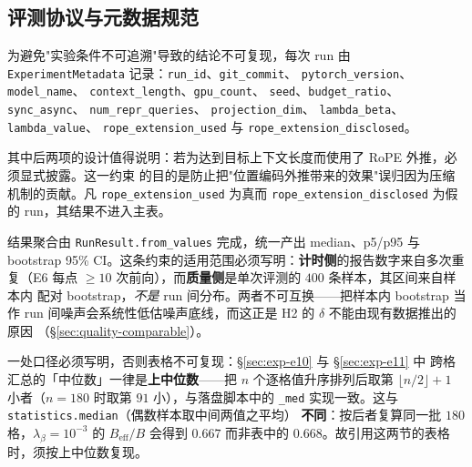 \subsection{评测协议与元数据规范}
\label{sec:exp-metadata}

为避免"实验条件不可追溯"导致的结论不可复现，每次 run 由 \texttt{ExperimentMetadata}
记录：\texttt{run\_}\allowbreak\texttt{id}、\texttt{git\_}\allowbreak\texttt{commit}、
\texttt{pytorch\_}\allowbreak\texttt{version}、\texttt{model\_}\allowbreak\texttt{name}、
\texttt{context\_}\allowbreak\texttt{length}、\texttt{gpu\_}\allowbreak\texttt{count}、
\texttt{seed}、\texttt{budget\_}\allowbreak\texttt{ratio}、
\texttt{sync\_}\allowbreak\texttt{async}、
\texttt{num\_}\allowbreak\texttt{repr\_}\allowbreak\texttt{queries}、
\texttt{projection\_}\allowbreak\texttt{dim}、
\texttt{lambda\_}\allowbreak\texttt{beta}、\texttt{lambda\_}\allowbreak\texttt{value}、
\texttt{rope\_}\allowbreak\texttt{extension\_}\allowbreak\texttt{used} 与
\texttt{rope\_}\allowbreak\texttt{extension\_}\allowbreak\texttt{disclosed}。

其中后两项的设计值得说明：若为达到目标上下文长度而使用了 RoPE 外推，必须显式披露。这一约束
的目的是防止把"位置编码外推带来的效果"误归因为压缩机制的贡献。凡
\texttt{rope\_}\allowbreak\texttt{extension\_}\allowbreak\texttt{used}
为真而 \texttt{rope\_}\allowbreak\texttt{extension\_}\allowbreak\texttt{disclosed}
为假的 run，其结果不进入主表。

结果聚合由 \texttt{RunResult.from\_values} 完成，统一产出 median、p5/p95 与
bootstrap 95\% CI。这条约束的适用范围必须写明：\textbf{计时侧}的报告数字来自多次重复（E6 每点
$\ge 10$ 次前向），而\textbf{质量侧}是单次评测的 $400$ 条样本，其区间来自样本内
配对 bootstrap，\emph{不是} run 间分布。两者不可互换——把样本内 bootstrap 当作
run 间噪声会系统性低估噪声底线，而这正是 H2 的 $\delta$ 不能由现有数据推出的原因
（\S\ref{sec:quality-comparable}）。

一处口径必须写明，否则表格不可复现：\S\ref{sec:exp-e10} 与 \S\ref{sec:exp-e11} 中
跨格汇总的「中位数」一律是\textbf{上中位数}——把 $n$ 个逐格值升序排列后取第
$\lfloor n/2\rfloor+1$ 小者（$n=180$ 时取第 $91$ 小），与落盘脚本中的
\texttt{\_med} 实现一致。这与 \texttt{statistics.median}（偶数样本取中间两值之平均）
\textbf{不同}：按后者复算同一批 $180$ 格，$\lambda_\beta=10^{-3}$ 的 $B_{\text{eff}}/B$
会得到 $0.667$ 而非表中的 $0.668$。故引用这两节的表格时，须按上中位数复现。

